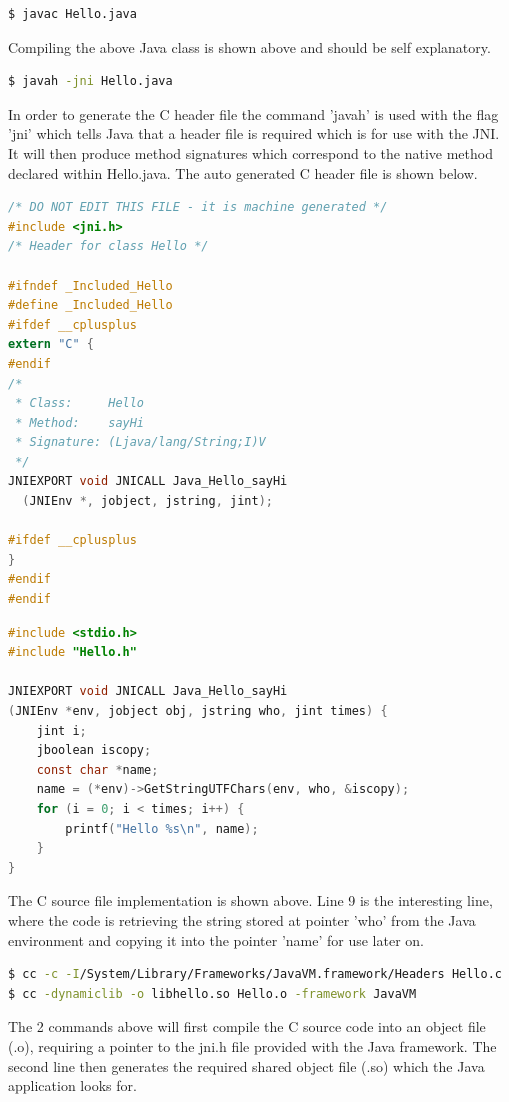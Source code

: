 \documentclass[a4paper, titlepage]{article}
\begin{document}
\begin{lstlisting}[language=sh]
$ javac Hello.java
\end{lstlisting}
Compiling the above Java class is shown above and should be self explanatory.

\begin{lstlisting}[language=sh]
$ javah -jni Hello.java
\end{lstlisting}
In order to generate the C header file the command 'javah' is used with the flag 'jni' which tells Java that a header file is required which is for use with the JNI. It will then produce method signatures which correspond to the native method declared within Hello.java. The auto generated C header file is shown below.

\begin{lstlisting}[language=C]
/* DO NOT EDIT THIS FILE - it is machine generated */
#include <jni.h>
/* Header for class Hello */

#ifndef _Included_Hello
#define _Included_Hello
#ifdef __cplusplus
extern "C" {
#endif
/*
 * Class:     Hello
 * Method:    sayHi
 * Signature: (Ljava/lang/String;I)V
 */
JNIEXPORT void JNICALL Java_Hello_sayHi
  (JNIEnv *, jobject, jstring, jint);

#ifdef __cplusplus
}
#endif
#endif
\end{lstlisting}

\begin{lstlisting}[language=C]
#include <stdio.h>
#include "Hello.h"

JNIEXPORT void JNICALL Java_Hello_sayHi
(JNIEnv *env, jobject obj, jstring who, jint times) {
    jint i;
    jboolean iscopy;
    const char *name;
    name = (*env)->GetStringUTFChars(env, who, &iscopy);
    for (i = 0; i < times; i++) {
        printf("Hello %s\n", name);
    }
}
\end{lstlisting}
The C source file implementation is shown above. Line 9 is the interesting line, where the code is retrieving the string stored at pointer 'who' from the Java environment and copying it into the pointer 'name' for use later on.

\begin{lstlisting}[language=sh]
$ cc -c -I/System/Library/Frameworks/JavaVM.framework/Headers Hello.c
$ cc -dynamiclib -o libhello.so Hello.o -framework JavaVM
\end{lstlisting}
The 2 commands above will first compile the C source code into an object file (.o), requiring a pointer to the jni.h file provided with the Java framework. The second line then generates the required shared object file (.so) which the Java application looks for.
\end{document}
